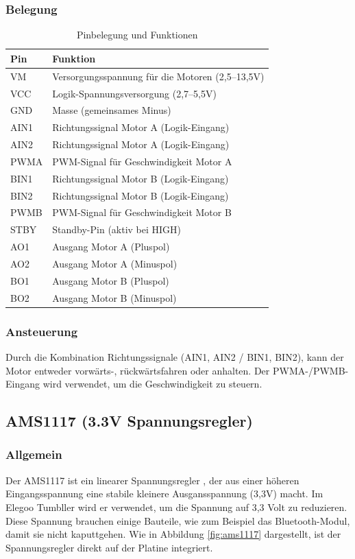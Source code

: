 \subsubsection{Belegung}
\begin{table}[h]
    \centering
    \begin{tabular}{|l|p{10cm}|}
    \hline
    \textbf{Pin} & \textbf{Funktion} \\
    \hline
    VM    & Versorgungsspannung für die Motoren (2,5–13,5V) \\
    VCC   & Logik-Spannungsversorgung (2,7–5,5V) \\
    GND   & Masse (gemeinsames Minus) \\
    AIN1  & Richtungssignal Motor A (Logik-Eingang) \\
    AIN2  & Richtungssignal Motor A (Logik-Eingang) \\
    PWMA  & PWM-Signal für Geschwindigkeit Motor A \\
    BIN1  & Richtungssignal Motor B (Logik-Eingang) \\
    BIN2  & Richtungssignal Motor B (Logik-Eingang) \\
    PWMB  & PWM-Signal für Geschwindigkeit Motor B \\
    STBY  & Standby-Pin (aktiv bei HIGH) \\
    AO1   & Ausgang Motor A (Pluspol) \\
    AO2   & Ausgang Motor A (Minuspol) \\
    BO1   & Ausgang Motor B (Pluspol) \\
    BO2   & Ausgang Motor B (Minuspol) \\
    \hline
    \end{tabular}
    \caption{Pinbelegung und Funktionen}
    \end{table}

\subsubsection{Ansteuerung}
Durch die Kombination Richtungssignale (AIN1, AIN2 / BIN1, BIN2),
kann der Motor entweder vorwärts-, rückwärtsfahren oder anhalten.
%
Der PWMA-/PWMB-Eingang wird verwendet, um die Geschwindigkeit zu steuern.
%
\subsection{AMS1117 (3.3V Spannungsregler)}
%
\subsubsection{Allgemein}
Der AMS1117 ist ein linearer Spannungsregler \cite{ams-1117},
der aus einer höheren Eingangsspannung eine stabile kleinere Ausgansspannung (3,3V) macht.
%
Im Elegoo Tumbller wird er verwendet,
um die Spannung auf 3,3 Volt zu reduzieren.
%
Diese Spannung brauchen einige Bauteile,
wie zum Beispiel das Bluetooth-Modul,
damit sie nicht kaputtgehen.
%
Wie in Abbildung \ref{fig:ams1117} dargestellt,
ist der Spannungsregler direkt auf der Platine integriert.
